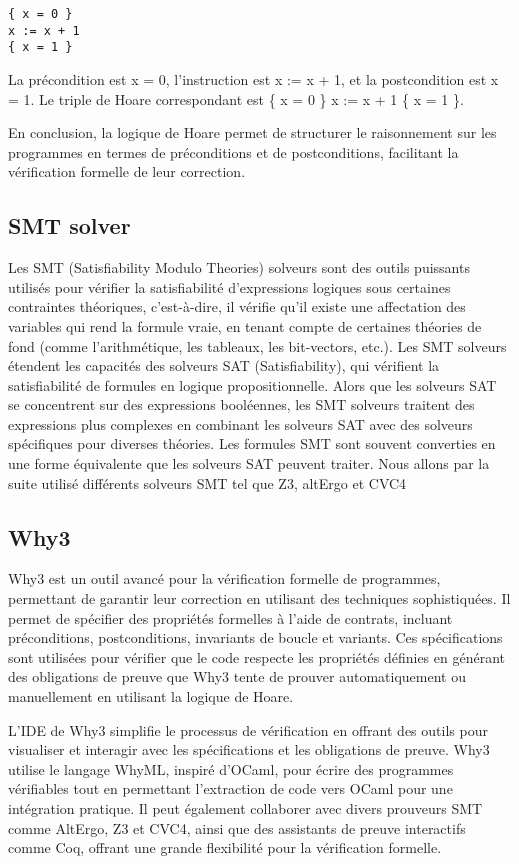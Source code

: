 \documentclass[11pt]{article}
\begin{document}
\begin{verbatim}
{ x = 0 } 
x := x + 1 
{ x = 1 }
\end{verbatim}
La précondition est x = 0, l'instruction est x := x + 1, et la postcondition est x = 1. Le triple de Hoare correspondant est \{ x = 0 \} x := x + 1 \{ x = 1 \}.

En conclusion, la logique de Hoare permet de structurer le raisonnement sur les programmes en termes de préconditions et de postconditions, facilitant la vérification formelle de leur correction.
\subsection{SMT solver}
\label{sec:orgda061ef}

Les SMT (Satisfiability Modulo Theories) solveurs sont des outils puissants utilisés pour 
vérifier la satisfiabilité d'expressions logiques sous certaines contraintes théoriques, 
c'est-à-dire, il vérifie qu'il existe une affectation des variables qui rend la formule vraie, 
en tenant compte de certaines théories de fond (comme l'arithmétique, les tableaux, les bit-vectors, etc.).
Les SMT solveurs étendent les capacités des solveurs SAT (Satisfiability), 
qui vérifient la satisfiabilité de formules en logique propositionnelle. 
Alors que les solveurs SAT se concentrent sur des expressions booléennes, 
les SMT solveurs traitent des expressions plus complexes en combinant les solveurs SAT avec des solveurs spécifiques pour diverses théories.
Les formules SMT sont souvent converties en une forme équivalente que les solveurs SAT peuvent traiter.
Nous allons par la suite utilisé différents solveurs SMT tel que Z3, altErgo et CVC4

\subsection{Why3}
\label{sec:orga1f0b79}

Why3 est un outil avancé pour la vérification formelle de programmes, 
permettant de garantir leur correction en utilisant des techniques sophistiquées. 
Il permet de spécifier des propriétés formelles à l'aide de contrats, incluant préconditions, postconditions, 
invariants de boucle et variants. 
Ces spécifications sont utilisées pour vérifier que le code respecte les propriétés définies en générant des obligations de preuve que Why3
tente de prouver automatiquement ou manuellement en utilisant la logique de Hoare.

L'IDE de Why3 simplifie le processus de vérification en offrant des outils 
pour visualiser et interagir avec les spécifications et les obligations de preuve. 
Why3 utilise le langage WhyML, inspiré d'OCaml, pour écrire des programmes vérifiables tout en permettant 
l'extraction de code vers OCaml pour une intégration pratique. 
Il peut également collaborer avec divers prouveurs SMT comme AltErgo, Z3 et CVC4, 
ainsi que des assistants de preuve interactifs comme Coq, 
offrant une grande flexibilité pour la vérification formelle.
\end{document}
